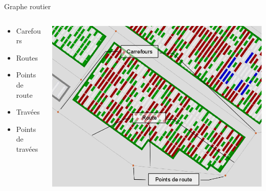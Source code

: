 \documentclass{beamer}
\begin{document}
  \begin{frame}{Graphe routier}
\begin{columns}
    \begin{column}[l]{4.0cm}	
	\begin{itemize}
	  \item Carefours
	  \item Routes
	  \item Points de route
	  \item Travées
	  \item Points de travées
	\end{itemize}
    \end{column}
    \begin{column}[r]{6.5cm}
	\begin{flushright}
	  \includegraphics[height=.55\textheight]{fig/FigPointsDeRoute.png}
	\end{flushright}
    \end{column}
 \end{columns}	
    
 \end{frame}
\end{document}
